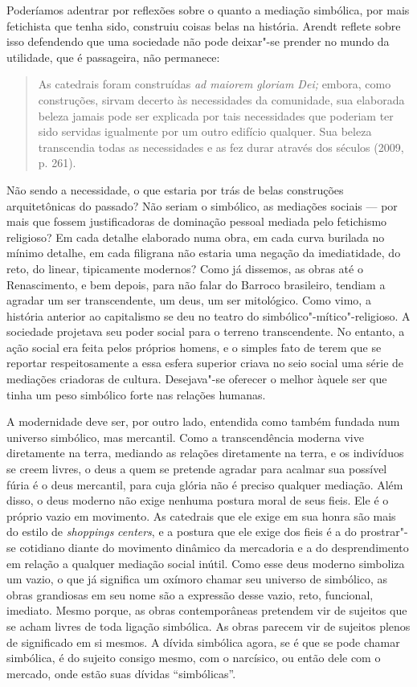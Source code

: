 Poderíamos adentrar por reflexões sobre o quanto a mediação simbólica,
por mais fetichista que tenha sido, construiu coisas belas na história.
Arendt reflete sobre isso defendendo que uma sociedade não pode
deixar"-se prender no mundo da utilidade, que é passageira, não
permanece:

\begin{quote}
As catedrais foram construídas \emph{ad maiorem gloriam Dei;} embora,
como construções, sirvam decerto às necessidades da comunidade, sua
elaborada beleza jamais pode ser explicada por tais necessidades que
poderiam ter sido servidas igualmente por um outro edifício qualquer.
Sua beleza transcendia todas as necessidades e as fez durar através dos
séculos (2009, p. 261).
\end{quote}

Não sendo a necessidade, o que estaria por trás de belas construções
arquitetônicas do passado? Não seriam o simbólico, as mediações sociais
--- por mais que fossem justificadoras de dominação pessoal mediada pelo
fetichismo religioso? Em cada detalhe elaborado numa obra, em cada curva
burilada no mínimo detalhe, em cada filigrana não estaria uma negação da
imediatidade, do reto, do linear, tipicamente modernos? Como já
dissemos, as obras até o Renascimento, e bem depois, para não falar do
Barroco brasileiro, tendiam a agradar um ser transcendente, um deus, um
ser mitológico. Como vimo, a história anterior ao
capitalismo se deu no teatro do simbólico"-mítico"-religioso. A sociedade
projetava seu poder social para o terreno transcendente. No entanto, a
ação social era feita pelos próprios homens, e o simples fato de terem
que se reportar respeitosamente a essa esfera superior criava no seio
social uma série de mediações criadoras de cultura. Desejava"-se oferecer
o melhor àquele ser que tinha um peso simbólico forte nas relações
humanas.

A modernidade deve ser, por outro lado, entendida como também fundada
num universo simbólico, mas mercantil. Como a transcendência moderna
vive diretamente na terra, mediando as relações diretamente na terra, e
os indivíduos se creem livres, o deus a quem se pretende agradar para
acalmar sua possível fúria é o deus mercantil, para cuja glória não é
preciso qualquer mediação. Além disso, o deus moderno não exige nenhuma
postura moral de seus fieis. Ele é o próprio vazio em movimento. As
catedrais que ele exige em sua honra são mais do estilo de
\emph{shoppings} \emph{centers}, e a postura que ele exige dos fieis é a
 do prostrar"-se cotidiano diante do movimento dinâmico da mercadoria e a do desprendimento em relação a qualquer mediação social inútil. Como
esse deus moderno simboliza um vazio, o que já significa um oxímoro
chamar seu universo de simbólico, as obras grandiosas em seu nome são a
expressão desse vazio, reto, funcional, imediato. Mesmo porque, as obras
contemporâneas pretendem vir de sujeitos que se acham livres de toda
ligação simbólica. As obras parecem vir de sujeitos plenos de
significado em si mesmos. A dívida simbólica agora, se é que se pode
chamar simbólica, é do sujeito consigo mesmo, com o narcísico, ou então
dele com o mercado, onde estão suas dívidas ``simbólicas''.

